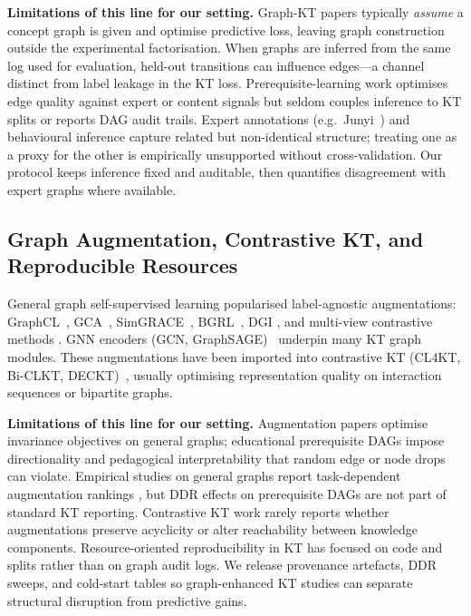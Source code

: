 \documentclass[runningheads]{llncs}
\newcommand{\KCs}{knowledge components}
\newcommand{\DDR}{\textsc{DDR}}
\begin{document}
\textbf{Limitations of this line for our setting.}
Graph-KT papers typically \emph{assume} a concept graph is given and
optimise predictive loss, leaving graph construction outside the
experimental factorisation. When graphs are inferred from the same log
used for evaluation, held-out transitions can influence edges---a
channel distinct from label leakage in the KT loss. Prerequisite-learning
work optimises edge quality against expert or content signals but seldom
couples inference to KT splits or reports DAG audit trails. Expert
annotations (e.g.\ Junyi~\cite{chang2015junyi,junyi_dataset}) and
behavioural inference capture related but non-identical structure; treating
one as a proxy for the other is empirically unsupported without
cross-validation. Our protocol keeps inference fixed and auditable, then
quantifies disagreement with expert graphs where available.

\subsection{Graph Augmentation, Contrastive KT, and Reproducible Resources}
\label{sec:related-aug}
General graph self-supervised learning popularised label-agnostic
augmentations: GraphCL~\cite{you2020graphcl}, GCA~\cite{zhu2021gca},
SimGRACE~\cite{xia2022simgrace}, BGRL~\cite{thakoor2021bgrl}, DGI
\cite{velickovic2018dgi}, and multi-view contrastive methods
\cite{hassani2020mvgrl,zhu2020graphtsa,feng2022graphmvp}. GNN encoders
(GCN, GraphSAGE)~\cite{kipf2017gcn,hamilton2017graphsage} underpin many
KT graph modules. These augmentations have been imported into contrastive
KT (CL4KT, Bi-CLKT, DECKT)~\cite{lee2022cl4kt,song2022biclkt,deckt2025,
wan2021contrastive}, usually optimising representation quality on
interaction sequences or bipartite graphs.

\textbf{Limitations of this line for our setting.}
Augmentation papers optimise invariance objectives on general graphs;
educational prerequisite DAGs impose directionality and pedagogical
interpretability that random edge or node drops can violate. Empirical
studies on general graphs report task-dependent augmentation rankings
\cite{zhu2020graphtsa}, but \DDR{} effects on prerequisite DAGs are not
part of standard KT reporting. Contrastive KT work rarely reports whether
augmentations preserve acyclicity or alter reachability between \KCs{}.
Resource-oriented reproducibility in KT has focused on code and splits
\cite{liu2022pykt} rather than on graph audit logs. We release provenance
artefacts, \DDR{} sweeps, and cold-start tables so graph-enhanced KT
studies can separate structural disruption from predictive gains.
\end{document}
